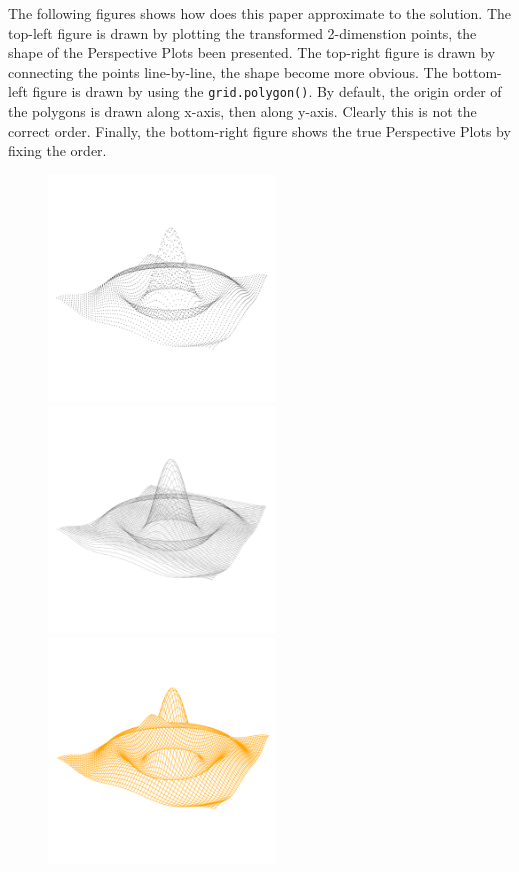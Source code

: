 \documentclass[paper=a4, fontsize=11pt]{report}
\begin{document}
The following figures shows how does this paper approximate to the solution. The top-left figure is drawn by plotting the transformed 2-dimenstion points, the shape of the Perspective Plots been presented. The top-right figure is drawn by connecting the points line-by-line, the shape become more obvious. The bottom-left figure is drawn by using the \texttt{grid.polygon()}. By default, the origin order of the polygons is drawn along x-axis, then along y-axis. Clearly this is not the correct order. Finally, the bottom-right figure shows the true Perspective Plots by fixing the order. 
\newpage
\begin{figure}[h]
\begin{center}
  \includegraphics[height = 6cm, width = 6cm]{figure/standalone_p_1.pdf}
  \includegraphics[height = 6cm, width = 6cm]{figure/standalone_p_2.pdf}
  \includegraphics[height = 6cm, width = 6cm]{figure/standalone_p_3.pdf}

\end{center}
\end{figure}
\end{document}
